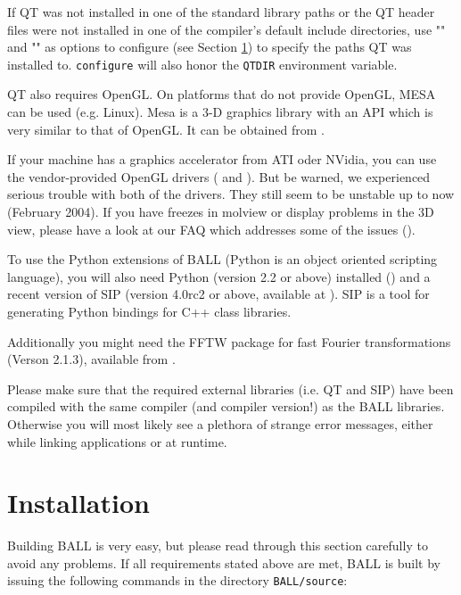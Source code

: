 If QT was not installed in one of the standard library paths or the
QT header files were not installed in one of the compiler's default
include directories, use \mbox{""} and
\mbox{""} as options to configure (see
Section \ref{section:building-ball}) to specify the paths QT was installed
to. {\tt configure} will also honor the {\tt QTDIR} environment variable.

QT also requires OpenGL. On platforms that do not provide OpenGL, MESA can
be used (e.g. Linux). Mesa is a 3-D graphics library with an API which is 
very similar to that of OpenGL. It can be obtained from 
.

If your machine has a graphics accelerator from ATI oder NVidia, 
you can use the vendor-provided OpenGL drivers (
and ).
But be warned, we experienced serious trouble with both of the drivers. They
still seem to be unstable up to now (February 2004). If you have freezes in
molview or display problems in the 3D view, please have a look at our FAQ
which addresses some of the issues
().

To use the Python extensions of BALL (Python is an object oriented
scripting language), you will also need Python (version 2.2 or above) installed
() and a recent version of SIP (version 4.0rc2 or
above, available at ). SIP is a tool
for generating Python bindings for C++ class libraries.

Additionally you might need the FFTW package for fast Fourier
transformations (Verson 2.1.3), available from .

Please make sure that the required external \CPP libraries (i.e. QT and SIP)
have been compiled with the same compiler (and compiler version!) as the BALL
libraries. Otherwise you will most likely see a plethora of strange error
messages, either while linking applications or at runtime.

\section{Installation}
\label{section:building-ball}

Building BALL is very easy, but please read through this section carefully to
avoid any problems.  If all requirements stated above are met, BALL is built
by issuing the following commands in the directory {\tt BALL/source}:

